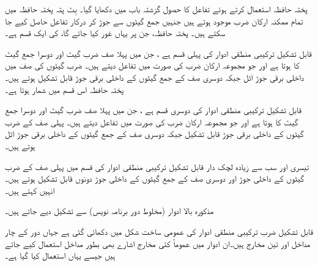 پختہ حافظہ استعمال کرتے ہوئے تفاعل کا حصول گزشتہ باب میں دکھایا گیا۔  بِٹ پتہ پختہ حافظہ میں تمام ممکنہ  ارکان ضرب موجود ہوتے ہیں جنہیں جمع گیٹوں سے جوڑ کر درکار تفاعل حاصل کیے جا سکتے ہیں۔ پختہ حافظہ، جن پر یہاں غور کیا جائے گا، کی ایک قسم ہے۔

قابل تشکیل ترکیبی منطقی ادوار کی پہلی قسم   ہے ، جن میں پہلا صف ضرب گیٹ اور دوسرا جمع گیٹ کا ہوتا ہے اور جو مجموعہ ارکان ضرب کی صورت میں تفاعل دیتے ہیں۔ ضرب گیٹوں کی صف میں داخلی برقی جوڑ اٹل جبکہ دوسری صف کے جمع گیٹوں کے داخلی برقی جوڑ قابل تشکیل ہوتے ہیں۔پختہ حافظہ اس قسم میں شمار ہوتا ہے۔

قابل تشکیل ترکیبی منطقی ادوار کی دوسری قسم   ہے ، جن میں پہلا صف ضرب گیٹ اور دوسرا جمع گیٹ کا ہوتا ہے اور جو مجموعہ ارکان ضرب کی صورت میں تفاعل دیتے ہیں۔ پہلی صف کے ضرب گیٹوں کے داخلی برقی جوڑ قابل تشکیل جبکہ دوسری صف کے جمع گیٹوں کے داخلی برقی جوڑ اٹل ہوتے ہیں۔

تیسری اور سب سے زیادہ لچک دار قابل تشکیل ترکیبی منطقی ادوار کی قسم میں پہلی صف کے ضرب گیٹوں کے داخلی جوڑ اور دوسری صف کے جمع گیٹوں کے داخلی جوڑ دونوں قابل تشکیل ہوتے ہیں۔انہیں کہتے ہیں۔

مذکورہ بالا ادوار  (مخلوط دور برنامہ نویس) سے تشکیل دیے جاتے ہیں۔


قابل تشکیل ضرب ترکیبی منطقی ادوار کی عمومی ساخت شکل    میں دکھائی گئی ہے جہاں دور کے چار مداخل اور تین مخارج ہیں۔ان ادوار میں عموماً کئی مخارج اشارے بھی بطور مداخل استعمال کیے جاتے ہیں جیسے یہاں  استعمال کیا گیا ہے۔

